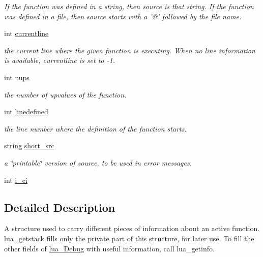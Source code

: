 \begin{DoxyCompactItemize}
\begin{DoxyCompactList}\small\item\em If the function was defined in a string, then source is that string. If the function was defined in a file, then source starts with a '@' followed by the file name. \item\end{DoxyCompactList}\item 
int \hyperlink{struct_tao_1_1_lua_1_1_lua_1_1lua___debug_a29ab177a580d9627f898fa689b301e6b}{currentline}
\begin{DoxyCompactList}\small\item\em the current line where the given function is executing. When no line information is available, currentline is set to -\/1. \item\end{DoxyCompactList}\item 
int \hyperlink{struct_tao_1_1_lua_1_1_lua_1_1lua___debug_a96ed9eeddaa6374472d97c1fe95a081d}{nups}
\begin{DoxyCompactList}\small\item\em the number of upvalues of the function. \item\end{DoxyCompactList}\item 
int \hyperlink{struct_tao_1_1_lua_1_1_lua_1_1lua___debug_ab99a0300b91f16877bb1908ed1e4f763}{linedefined}
\begin{DoxyCompactList}\small\item\em the line number where the definition of the function starts. \item\end{DoxyCompactList}\item 
string \hyperlink{struct_tao_1_1_lua_1_1_lua_1_1lua___debug_acf24961116b22664a053b4144b7d7dd2}{short\_\-src}
\begin{DoxyCompactList}\small\item\em a \char`\"{}printable\char`\"{} version of source, to be used in error messages. \item\end{DoxyCompactList}\item 
int \hyperlink{struct_tao_1_1_lua_1_1_lua_1_1lua___debug_a43d0c457affe69185de12e41896d00ca}{i\_\-ci}
\end{DoxyCompactItemize}


\subsection{Detailed Description}
A structure used to carry different pieces of information about an active function. lua\_\-getstack fills only the private part of this structure, for later use. To fill the other fields of \hyperlink{struct_tao_1_1_lua_1_1_lua_1_1lua___debug}{lua\_\-Debug} with useful information, call lua\_\-getinfo. 

